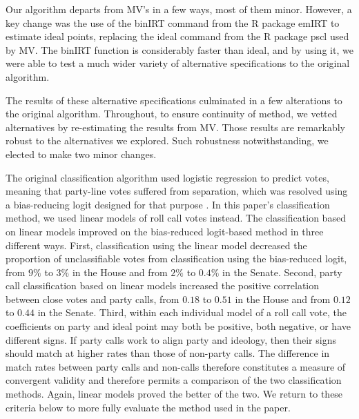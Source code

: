 \documentclass[12pt]{article}
\begin{document}
Our algorithm departs from MV's in a few ways, most of them minor.  However, a key change was the use of the \textsf{binIRT} command from the \textsf{R} package \textsf{emIRT} \citep{Imai:2016} to estimate ideal points, replacing the \textsf{ideal} command from the \textsf{R} package \textsf{pscl} \citep{Jackman:2015} used by MV.  The \textsf{binIRT} function is considerably faster than \textsf{ideal}, and by using it, we were able to test a much wider variety of alternative specifications to the original algorithm.

The results of these alternative specifications culminated in a few alterations to the original algorithm.
Throughout, to ensure continuity of method, we vetted alternatives by re-estimating the results from MV.
Those results are remarkably robust to the alternatives we explored.
Such robustness notwithstanding, we elected to make two minor changes.

The original classification algorithm used logistic regression to predict votes,
meaning that party-line votes suffered from separation, which was resolved using
a bias-reducing logit designed for that purpose \citep{Zorn:2005}.
In this paper's classification method, we used linear models of roll call votes
instead.
The classification based on linear models improved
on the bias-reduced logit-based method in three different ways.
First, classification using the linear model decreased the proportion of
unclassifiable votes from classification using the bias-reduced logit,
from $9\%$ to $3\%$ in the House and
from $2\%$ to $0.4\%$ in the Senate.
Second, party call classification based on linear models increased the positive
correlation between close votes and party calls,
from $0.18$ to $0.51$ in the House and
from $0.12$ to $0.44$ in the Senate.
Third, within each individual model of a roll call vote, the coefficients on
party and ideal point may both be positive, both negative, or have different
signs.
If party calls work to align party and ideology, then their signs should
match at higher rates than those of non-party calls.
The difference in match rates between party calls and non-calls therefore
constitutes a measure of convergent validity and therefore permits a comparison
of the two classification methods.
Again, linear models proved the better of the two.
We return to these criteria below to more fully evaluate the method used
in the paper.
\end{document}

